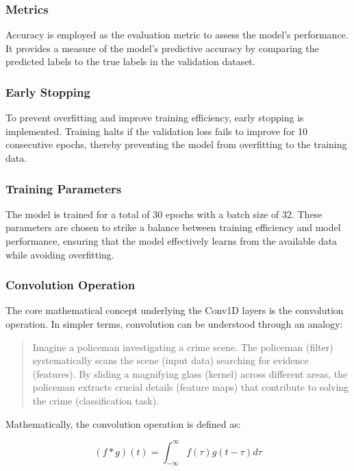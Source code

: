 \subsubsection{Metrics}

Accuracy is employed as the evaluation metric to assess the model's performance. It provides a measure of the model's predictive accuracy by comparing the predicted labels to the true labels in the validation dataset.

\subsubsection{Early Stopping}

To prevent overfitting and improve training efficiency, early stopping is implemented. Training halts if the validation loss fails to improve for 10 consecutive epochs, thereby preventing the model from overfitting to the training data.

\subsubsection{Training Parameters}

The model is trained for a total of 30 epochs with a batch size of 32. These parameters are chosen to strike a balance between training efficiency and model performance, ensuring that the model effectively learns from the available data while avoiding overfitting.

\subsubsection{Convolution Operation}

The core mathematical concept underlying the Conv1D layers is the convolution operation. In simpler terms, convolution can be understood through an analogy:

\begin{quote}
 Imagine a policeman investigating a crime scene. The policeman (filter) systematically scans the scene (input data) searching for evidence (features). By sliding a magnifying glass (kernel) across different areas, the policeman extracts crucial details (feature maps) that contribute to solving the crime (classification task).
\end{quote}

Mathematically, the convolution operation is defined as:

\begin{equation}
(f * g)(t) = \int_{-\infty}^{\infty} f(\tau)g(t - \tau) d\tau
\end{equation}

